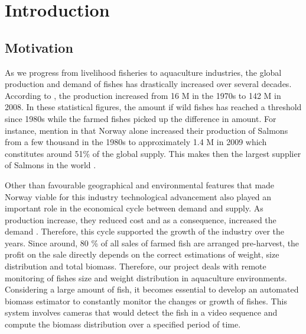 \chapter{Introduction}
\label{chapter:Introduction}



 
\section{Motivation}
As we progress from livelihood fisheries to aquaculture industries, the global 
production and demand of fishes has drastically increased over several decades. 
According to \cite{Asche2011}, the production increased from 16 M in the 1970s to 
142 M in 2008. In these statistical figures, the amount if wild fishes has reached 
a threshold since 1980s while the farmed fishes picked up the difference in amount.
For instance, \citeauthor{LARSEN2011a} mention in \citeyearpar{LARSEN2011a} that Norway 
alone increased their production of Salmons from a few thousand in the 1980s to 
approximately 1.4 M in 2009 which constitutes around 51\% of the global supply. 
This makes then the largest supplier of Salmons in the world \citep{Asche2011, LARSEN2011a, Liu2011}.

Other than favourable geographical and environmental features that made Norway viable 
for this industry technological advancement also played an important role in the 
economical cycle between demand and supply. As production increase, they reduced 
cost and as a consequence, increased the demand \cite{Asche2011}. Therefore, this cycle 
supported the growth of the industry over the years.
Since around, 80 \% of all sales of farmed fish are arranged pre-harvest, the profit 
on the sale directly depends on the correct estimations of weight, size distribution 
and total biomass. Therefore, our project deals with remote monitoring of fishes size 
and weight distribution in aquaculture environments. Considering a large amount of fish, 
it becomes essential to develop an automated biomass estimator to constantly monitor 
the changes or growth of fishes. This system involves cameras that would detect the 
fish in a video sequence and compute the biomass distribution over a specified period 
of time.

